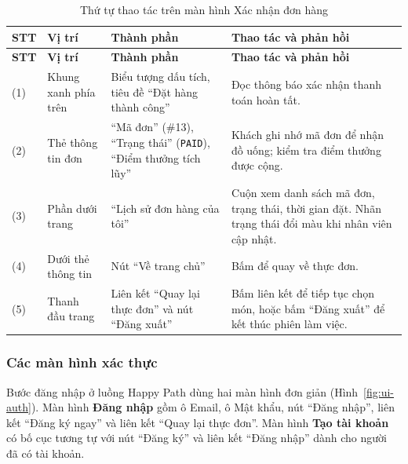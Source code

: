 \begin{minipage}{\textwidth}
\centering
{}
\label{fig:wf-xacnhan}
\end{minipage}
\vspace{10pt}

\begin{longtable}{|p{1.0cm}|p{2.5cm}|p{4.5cm}|p{5.5cm}|}
  \caption{Thứ tự thao tác trên màn hình Xác nhận đơn hàng}\label{tab:wf-xacnhan}\\
  \hline
  \textbf{STT} & \textbf{Vị trí} & \textbf{Thành phần} & \textbf{Thao tác và phản hồi} \\
  \hline
  \endfirsthead
  \hline
  \textbf{STT} & \textbf{Vị trí} & \textbf{Thành phần} & \textbf{Thao tác và phản hồi} \\
  \hline
  \endhead
  (1) & Khung xanh phía trên & Biểu tượng dấu tích, tiêu đề ``Đặt hàng thành công'' & Đọc thông báo xác nhận thanh toán hoàn tất. \\
  \hline
  (2) & Thẻ thông tin đơn & ``Mã đơn'' (\#13), ``Trạng thái'' (\texttt{PAID}), ``Điểm thưởng tích lũy'' & Khách ghi nhớ mã đơn để nhận đồ uống; kiểm tra điểm thưởng được cộng. \\
  \hline
  (3) & Phần dưới trang & ``Lịch sử đơn hàng của tôi'' & Cuộn xem danh sách mã đơn, trạng thái, thời gian đặt. Nhãn trạng thái đổi màu khi nhân viên cập nhật. \\
  \hline
  (4) & Dưới thẻ thông tin & Nút ``Về trang chủ'' & Bấm để quay về thực đơn. \\
  \hline
  (5) & Thanh đầu trang & Liên kết ``Quay lại thực đơn'' và nút ``Đăng xuất'' & Bấm liên kết để tiếp tục chọn món, hoặc bấm ``Đăng xuất'' để kết thúc phiên làm việc. \\
  \hline
\end{longtable}

\subsubsection{Các màn hình xác thực}

Bước đăng nhập ở luồng Happy Path dùng hai màn hình đơn giản (Hình~\ref{fig:ui-auth}). Màn hình \textbf{Đăng nhập} gồm ô Email, ô Mật khẩu, nút ``Đăng nhập'', liên kết ``Đăng ký ngay'' và liên kết ``Quay lại thực đơn''. Màn hình \textbf{Tạo tài khoản} có bố cục tương tự với nút ``Đăng ký'' và liên kết ``Đăng nhập'' dành cho người đã có tài khoản.

